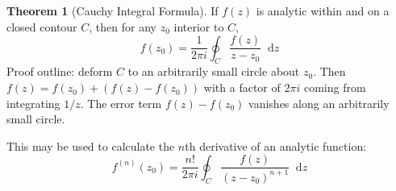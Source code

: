 \documentclass{article}
\newcommand{\diff}{\mathop{}\!\mathrm{d}}
\theoremstyle{definition}
\newtheorem{thm}{Theorem}[section]
\begin{document}
\begin{thm}[Cauchy Integral Formula]
	If $f(z)$ is analytic within and on a closed contour $C$, then for any $z_0$ interior
	to $C$,
	\begin{equation*}
		f(z_0) = \frac{1}{2\pi i} \oint_C \frac{f(z)}{z - z_0} \diff z
	\end{equation*}
	Proof outline: deform $C$ to an arbitrarily small circle about $z_0$. Then $f(z)
	= f(z_0) + (f(z) - f(z_0))$ with a factor of $2\pi i$ coming from integrating
	$1/z$. The error term $f(z) - f(z_0)$ vanishes along an arbitrarily small circle. 
\end{thm}
This may be used to calculate the $n$th derivative of an analytic function:
\begin{equation*}
	f^{(n)}(z_0) = \frac{n!}{2\pi i} \oint_C \frac{f(z)}{(z-z_0)^{n+1}} \diff z
\end{equation*}
\end{document}

